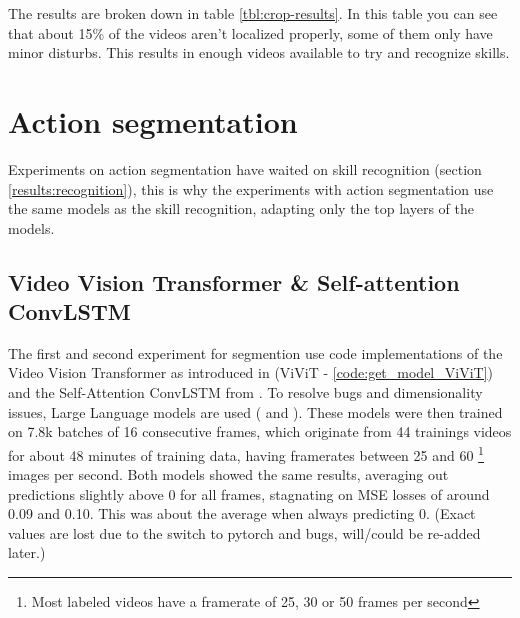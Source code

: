 The results are broken down in table \ref{tbl:crop-results}. In this table you can see that about 15\% of the videos aren't localized properly, some of them only have minor disturbs. This results in enough videos available to try and recognize skills.












\section{Action segmentation}

Experiments on action segmentation have waited on skill recognition (section \ref{results:recognition}), this is why the experiments with action segmentation use the same models as the skill recognition, adapting only the top layers of the models.

\subsection{Video Vision Transformer \& Self-attention ConvLSTM}
\label{subsec:video-models-from-scratch}

The first and second experiment for segmention use code implementations of the Video Vision Transformer as introduced in \textcite{Arnab2021} (ViViT - \ref{code:get_model_ViViT}) and the Self-Attention ConvLSTM from \textcite{Lin_2020}.
To resolve bugs and dimensionality issues, Large Language models are used (\autocite{OpenAI_ChatGPT_2025} and \autocite{Deepseek_2025}).
These models were then trained on 7.8k batches of 16 consecutive frames, which originate from 44 trainings videos for about 48 minutes of training data, having framerates between 25 and 60 \footnote{Most labeled videos have a framerate of 25, 30 or 50 frames per second} images per second.
Both models showed the same results, averaging out predictions slightly above 0 for all frames, stagnating on MSE losses of around 0.09 and 0.10. This was about the average when always predicting 0. (Exact values are lost due to the switch to pytorch and bugs, will/could be re-added later.)

